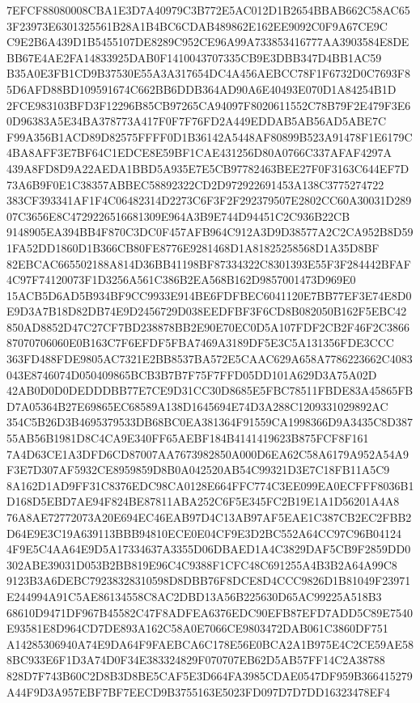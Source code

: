 \documentclass[UTF8,fontset=fandol,zihao=-4,a4paper]{ctexart}
\begin{document}
{{7EFCF88080008CBA1E3D7A40979C3B772E5AC012D1B2654BBAB662C58AC653F23973E6301325561B28A1B4BC6CDAB489862E162EE9092C0F9A67CE9C
C9E2B6A439D1B5455107DE8289C952CE96A99A733853416777AA3903584E8DEBB67E4AE2FA14833925DAB0F1410043707335CB9E3DBB347D4BB1AC59
B35A0E3FB1CD9B37530E55A3A317654DC4A456AEBCC78F1F6732D0C7693F85D6AFD88BD109591674C662BB6DDB364AD90A6E40493E070D1A84254B1D
2FCE983103BFD3F12296B85CB97265CA94097F8020611552C78B79F2E479F3E60D96383A5E34BA378773A417F0F7F76FD2A449EDDAB5AB56AD5ABE7C
F99A356B1ACD89D82575FFFF0D1B36142A5448AF80899B523A91478F1E6179C4BA8AFF3E7BF64C1EDCE8E59BF1CAE431256D80A0766C337AFAF4297A
439A8FD8D9A22AEDA1BBD5A935E7E5CB97782463BEE27F0F3163C644EF7D73A6B9F0E1C38357ABBEC58892322CD2D972922691453A138C3775274722
383CF393341AF1F4C06482314D2273C6F3F2F292379507E2802CC60A30031D28907C3656E8C4729226516681309E964A3B9E744D94451C2C936B22CB
9148905EA394BB4F870C3DC0F457AFB964C912A3D9D38577A2C2CA952B8D591FA52DD1860D1B366CB80FE8776E9281468D1A81825258568D1A35D8BF
82EBCAC665502188A814D36BB41198BF87334322C8301393E55F3F284442BFAF4C97F74120073F1D3256A561C386B2EA568B162D9857001473D969E0
15ACB5D6AD5B934BF9CC9933E914BE6FDFBEC6041120E7BB77EF3E74E8D0E9D3A7B18D82DB74E9D2456729D038EEDFBF3F6CD8B082050B162F5EBC42
850AD8852D47C27CF7BD238878BB2E90E70EC0D5A107FDF2CB2F46F2C386687070706060E0B163C7F6EFDF5FBA7469A3189DF5E3C5A131356FDE3CCC
363FD488FDE9805AC7321E2BB8537BA572E5CAAC629A658A7786223662C4083043E8746074D050409865BCB3B7B7F75F7FFD05DD101A629D3A75A02D
42AB0D0D0DEDDDBB77E7CE9D31CC30D8685E5FBC78511FBDE83A45865FBD7A05364B27E69865EC68589A138D1645694E74D3A288C1209331029892AC
354C5B26D3B4695379533DB68BC0EA381364F91559CA1998366D9A3435C8D38755AB56B1981D8C4CA9E340FF65AEBF184B4141419623B875FCF8F161
7A4D63CE1A3DFD6CD87007AA7673982850A000D6EA62C58A6179A952A54A9F3E7D307AF5932CE8959859D8B0A042520AB54C99321D3E7C18FB11A5C9
8A162D1AD9FF31C8376EDC98CA0128E664FFC774C3EE099EA0ECFFF8036B1D168D5EBD7AE94F824BE87811ABA252C6F5E345FC2B19E1A1D56201A4A8
76A8AE72772073A20E694EC46EAB97D4C13AB97AF5EAE1C387CB2EC2FBB2D64E9E3C19A639113BBB94810ECE0E04CF9E3D2BC552A64CC97C96B04124
4F9E5C4AA64E9D5A17334637A3355D06DBAED1A4C3829DAF5CB9F2859DD0302ABE39031D053B2BB819E96C4C9388F1CFC48C691255A4B3B2A64A99C8
9123B3A6DEBC79238328310598D8DBB76F8DCE8D4CCC9826D1B81049F23971E244994A91C5AE86134558C8AC2DBD13A56B225630D65AC99225A518B3
68610D9471DF967B45582C47F8ADFEA6376EDC90EFB87EFD7ADD5C89E7540E93581E8D964CD7DE893A162C58A0E7066CE9803472DAB061C3860DF751
A14285306940A74E9DA64F9FAEBCA6C178E56E0BCA2A1B975E4C2CE59AE588BC933E6F1D3A74D0F34E383324829F070707EB62D5AB57FF14C2A38788
828D7F743B60C2D8B3D8BE5CAF5E3D664FA3985CDAE0547DF959B366415279A44F9D3A957EBF7BF7EECD9B3755163E5023FD097D7D7DD16323478EF4
}}
\end{document}
